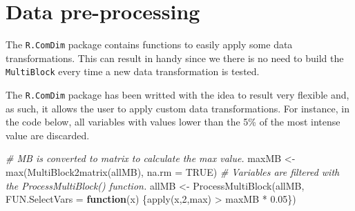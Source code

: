 \documentclass[
]{book}
\newenvironment{Shaded}{\begin{snugshade}}{\end{snugshade}}
\newcommand{\AttributeTok}[1]{\textcolor[rgb]{0.77,0.63,0.00}{#1}}
\newcommand{\CommentTok}[1]{\textcolor[rgb]{0.56,0.35,0.01}{\textit{#1}}}
\newcommand{\ConstantTok}[1]{\textcolor[rgb]{0.00,0.00,0.00}{#1}}
\newcommand{\ControlFlowTok}[1]{\textcolor[rgb]{0.13,0.29,0.53}{\textbf{#1}}}
\newcommand{\DecValTok}[1]{\textcolor[rgb]{0.00,0.00,0.81}{#1}}
\newcommand{\DocumentationTok}[1]{\textcolor[rgb]{0.56,0.35,0.01}{\textbf{\textit{#1}}}}
\newcommand{\FloatTok}[1]{\textcolor[rgb]{0.00,0.00,0.81}{#1}}
\newcommand{\FunctionTok}[1]{\textcolor[rgb]{0.00,0.00,0.00}{#1}}
\newcommand{\NormalTok}[1]{#1}
\newcommand{\OtherTok}[1]{\textcolor[rgb]{0.56,0.35,0.01}{#1}}
\newcommand{\SpecialCharTok}[1]{\textcolor[rgb]{0.00,0.00,0.00}{#1}}
\newcommand{\StringTok}[1]{\textcolor[rgb]{0.31,0.60,0.02}{#1}}
\begin{document}
\hypertarget{processing}{%
\section{Data pre-processing}\label{processing}}

The \texttt{R.ComDim} package contains functions to easily apply some data
transformations. This can result in handy since we there is no need to build
the \texttt{MultiBlock} every time a new data transformation is tested.

\begin{Shaded}
\end{Shaded}

The \texttt{R.ComDim} package has been writted with the idea to result very flexible
and, as such, it allows the user to apply custom data transformations. For
instance, in the code below, all variables with values lower than the 5\% of the
most intense value are discarded.

\begin{Shaded}
\begin{Highlighting}[]
\CommentTok{\# MB is converted to matrix to calculate the max value.}
\NormalTok{maxMB }\OtherTok{\textless{}{-}} \FunctionTok{max}\NormalTok{(}\FunctionTok{MultiBlock2matrix}\NormalTok{(allMB), }\AttributeTok{na.rm =} \ConstantTok{TRUE}\NormalTok{) }
\CommentTok{\# Variables are filtered with the ProcessMultiBlock() function.}
\NormalTok{allMB }\OtherTok{\textless{}{-}} \FunctionTok{ProcessMultiBlock}\NormalTok{(allMB,}
  \AttributeTok{FUN.SelectVars =} \ControlFlowTok{function}\NormalTok{(x) \{}\FunctionTok{apply}\NormalTok{(x,}\DecValTok{2}\NormalTok{,max) }\SpecialCharTok{\textgreater{}}\NormalTok{ maxMB }\SpecialCharTok{*} \FloatTok{0.05}\NormalTok{\})}
\end{Highlighting}
\end{Shaded}
\end{document}
